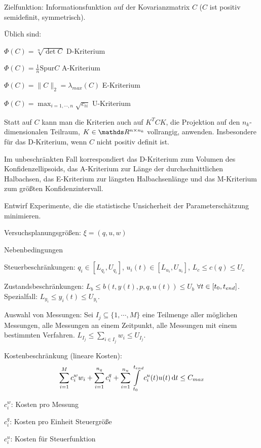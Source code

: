Zielfunktion: Informationsfunktion auf der Kovarianzmatrix $C$ ($C$ ist positiv semidefinit, symmetrisch).

Üblich sind:

\bitm
\item $\Phi(C) = \sqrt[n]{\det C}$ D-Kriterium 
\item $\Phi(C) = \frac 1n \mathrm{Spur} C$ A-Kriterium
\item $\Phi(C) = \|C\|_2 = \lambda_{max} (C)$ E-Kriterium
\item $\Phi(C) = \max_{i=1,\cdots,n} \sqrt{c_{ii}}$ U-Kriterium
\eitm


Statt auf $C$ kann man die Kriterien auch auf $K^T C K$, die Projektion auf den $n_k$-dimensionalen Teilraum, $K \in \R^{n\times n_k}$ vollrangig, anwenden. Insbesondere für das D-Kriterium, wenn $C$ nicht positiv definit ist.


Im unbeschränkten Fall korrespondiert das D-Kriterium zum Volumen des Konfidenzellipsoids, das A-Kriterium zur Länge der durchschnittlichen Halbachsen, das E-Kriterium zur längsten Halbachsenlänge und das M-Kriterium zum größten Konfidenzintervall.


Entwirf Experimente, die die statistische Unsicherheit der Parameterschätzung minimieren. 

Versuchsplanungsgrößen: $\xi = (q,u,w)$


Nebenbedingungen

\bitm
\item Steuerbeschränkungen: $q_i \in [L_{q_i}, U_{q_i}]$, $u_i(t) \in [L_{u_i}, U_{u_i}]$, $L_c \leq c(q) \leq U_c$
\item Zustandsbeschränkungen: $L_b \leq b(t,y(t),p,q,u(t)) \leq U_b$ $\forall t \in [{t_0}, {t_{end}}]$. Spezialfall: $L_{y_i} \leq y_i(t) \leq U_{y_i}$.
\item Auswahl von Messungen: Sei $I_j \subseteq \{1,\cdots,M\}$ eine Teilmenge aller möglichen Messungen, \zb alle Messungen an einem Zeitpunkt, alle Messungen mit einem bestimmten Verfahren. $L_{I_j} \leq \sum_{i\in I_j} w_i \leq U_{I_j}$.
\item Kostenbeschränkung (lineare Kosten): \[ \sum\limits_{i=1}^M c_i^w w_i + \sum\limits_{i=1}^{n_q} c_i^q + \sum\limits_{i=1}^{n_u} \int\limits_{t_0}^{t_{end}} c_i^u(t) u(t) \,\mathrm d t \leq C_{max}\]
\bitm
\item $c_i^w$: Kosten pro Messung
\item $c_i^q$: Kosten pro Einheit Steuergröße
\item $c_i^u$: Kosten für Steuerfunktion
\eitm
\eitm

